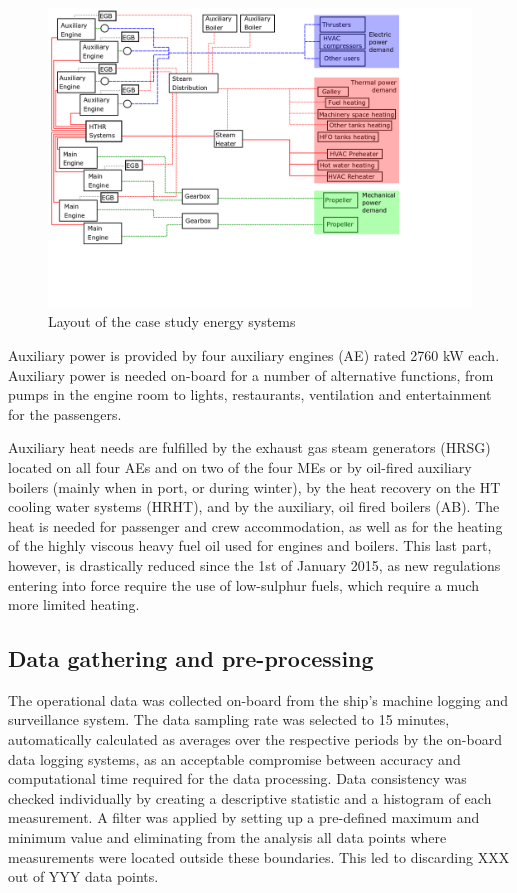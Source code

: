\documentclass[preprint,12pt]{elsarticle}
\begin{document}
\begin{figure}
	\centering
	\includegraphics[width=0.95\linewidth]{Figures/SystemGeneral}
	\caption{Layout of the case study energy systems}
	\label{fig:shipSystems}
\end{figure}


Auxiliary power is provided by four auxiliary engines (AE) rated 2760 kW each. Auxiliary power is needed on-board for a number of alternative functions, from pumps in the engine room to lights, restaurants, ventilation and entertainment for the passengers. 

Auxiliary heat needs are fulfilled by the exhaust gas steam generators (HRSG) located on all four AEs and on two of the four MEs or by oil-fired auxiliary boilers (mainly when in port, or during winter), by the heat recovery on the HT cooling water systems (HRHT), and by the auxiliary, oil fired boilers (AB). The heat is needed for passenger and crew accommodation, as well as for the heating of the highly viscous heavy fuel oil used for engines and boilers. This last part, however, is drastically reduced since the 1st of January 2015, as new regulations entering into force require the use of low-sulphur fuels, which require a much more limited heating.

\subsection{Data gathering and pre-processing} \label{sec:met:gathering}

The operational data was collected on-board from the ship's machine logging and surveillance system. The data sampling rate was selected to 15 minutes, automatically calculated as averages over the respective periods by the on-board data logging systems, as an acceptable compromise between accuracy and computational time required for the data processing. Data consistency was checked individually by creating a descriptive statistic and a histogram of each measurement. A filter was applied by setting up a pre-defined maximum and minimum value and eliminating from the analysis all data points where measurements were located outside these boundaries. This led to discarding XXX out of YYY data points.
\end{document}
